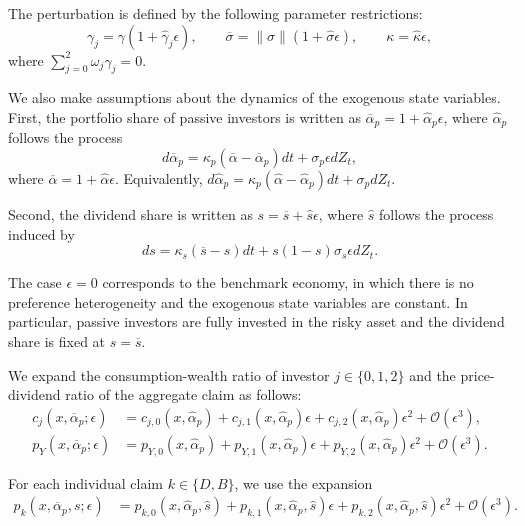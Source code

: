The perturbation is defined by the following parameter restrictions:
\begin{equation}
    \gamma_j = \gamma (1+\hat{\gamma}_j \epsilon), \qquad 
    \overline{\sigma} = \|\sigma\| (1+\hat{\sigma} \epsilon), \qquad 
    \kappa = \hat{\kappa} \epsilon, 
\end{equation}
where $\sum_{j=0}^2 \omega_j \hat{\gamma}_j = 0$.

We also make assumptions about the dynamics of the exogenous state variables.
First, the portfolio share of passive investors is written as $\overline{\alpha}_{p} = 1 + \hat{\alpha}_{p} \epsilon$, where $\hat{\alpha}_{p}$ follows the process
\begin{equation}
d \overline{\alpha}_{p} = \kappa_p (\overline{\alpha} - \overline{\alpha}_{p}) dt + \sigma_p \epsilon dZ_t,
\end{equation}
where $\overline{\alpha} = 1+\hat{\alpha} \epsilon$.
Equivalently, $d\hat{\alpha}_{p} = \kappa_p(\hat{\alpha}-\hat{\alpha}_{p})dt + \sigma_p dZ_t$.

Second, the dividend share is written as $s = \overline{s} + \hat{s} \epsilon$, where $\hat{s}$ follows the process induced by
\begin{equation}
    d s = \kappa_s ( \overline{s} - s )dt + s (1-s) \sigma_s \epsilon d Z_t.
\end{equation} 

The case $\epsilon = 0$ corresponds to the benchmark economy, in which there is no preference heterogeneity and the exogenous state variables are constant.
In particular, passive investors are fully invested in the risky asset and the dividend share is fixed at $s = \overline{s}$.


We expand the consumption-wealth ratio of investor $j\in\{0,1,2\}$ and the price-dividend ratio of the aggregate claim as follows:
\begin{align}
    c_{j}(x, \overline{\alpha}_p;\epsilon) &= c_{j,0}(x, \hat{\alpha}_p) + c_{j,1}(x, \hat{\alpha}_p) \epsilon+ c_{j,2}(x, \hat{\alpha}_p) \epsilon^2 + \mathcal{O}(\epsilon^3),\\
    p_{Y}(x, \overline{\alpha}_p;\epsilon) &= p_{Y,0}(x, \hat{\alpha}_p) + p_{Y,1}(x, \hat{\alpha}_p) \epsilon+ p_{Y,2}(x, \hat{\alpha}_p) \epsilon^2 + \mathcal{O}(\epsilon^3).
\end{align}

For each individual claim $k\in\{D,B\}$, we use the expansion
\begin{align}
    p_{k}(x, \overline{\alpha}_p, s;\epsilon) &= p_{k,0}(x, \hat{\alpha}_p, \hat{s}) + p_{k,1}(x, \hat{\alpha}_p, \hat{s}) \epsilon+ p_{k,2}(x, \hat{\alpha}_p, \hat{s}) \epsilon^2 + \mathcal{O}(\epsilon^3).
\end{align}

